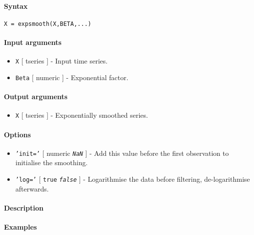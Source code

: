 


	\paragraph{Syntax}\label{syntax}

\begin{verbatim}
X = expsmooth(X,BETA,...)
\end{verbatim}

\paragraph{Input arguments}\label{input-arguments}

\begin{itemize}
\item
  \texttt{X} {[} tseries {]} - Input time series.
\item
  \texttt{Beta} {[} numeric {]} - Exponential factor.
\end{itemize}

\paragraph{Output arguments}\label{output-arguments}

\begin{itemize}
\itemsep1pt\parskip0pt
\item
  \texttt{X} {[} tseries {]} - Exponentially smoothed series.
\end{itemize}

\paragraph{Options}\label{options}

\begin{itemize}
\item
  \texttt{'init='} {[} numeric \textbar{} \emph{\texttt{NaN}} {]} - Add
  this value before the first observation to initialise the smoothing.
\item
  \texttt{'log='} {[} \texttt{true} \textbar{} \emph{\texttt{false}} {]}
  - Logarithmise the data before filtering, de-logarithmise afterwards.
\end{itemize}

\paragraph{Description}\label{description}

\paragraph{Examples}\label{examples}


